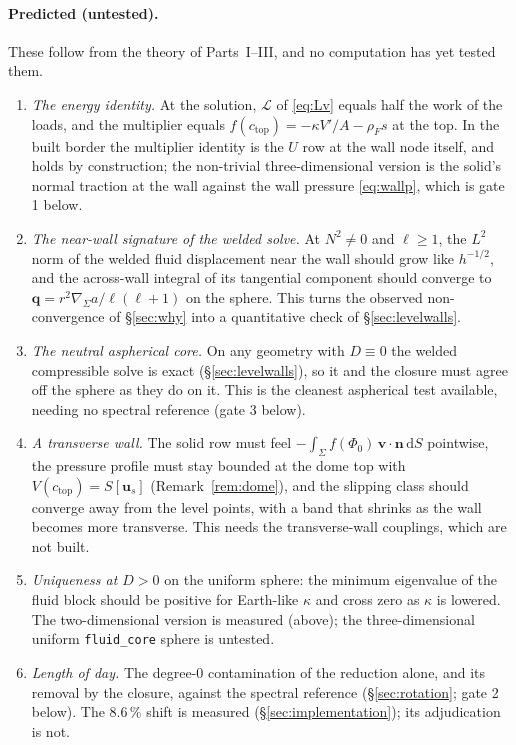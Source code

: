 \documentclass[11pt]{article}
\theoremstyle{definition}
\theoremstyle{remark}
\newcommand{\bu}{\mathbf{u}}
\newcommand{\bv}{\mathbf{v}}
\newcommand{\bn}{\mathbf{n}}
\newcommand{\bq}{\mathbf{q}}
\newcommand{\dS}{\,\mathrm{d}S}
\newcommand{\gradS}{\nabla_\Sigma}
\newcommand{\Ltot}{\mathcal L}
\newcommand{\code}[1]{\texttt{#1}}
\begin{document}
\paragraph{Predicted (untested).} These follow from
the theory of Parts~I--III, and no computation has yet tested them.
\begin{enumerate}[label=(\roman*)]
\item \emph{The energy identity.} At the solution, $\Ltot$ of
  \eqref{eq:Lv} equals half the work of the loads, and the multiplier
  equals $f(c_{\mathrm{top}}) = -\kappa V'/A - \rho_Fs$ at the top. In
  the built border the multiplier identity is the $U$ row at the wall
  node itself, and holds by construction; the non-trivial
  three-dimensional version is the solid's normal traction at the wall
  against the wall pressure \eqref{eq:wallp}, which is gate 1 below.
\item \emph{The near-wall signature of the welded solve.} At $N^2 \ne 0$
  and $\ell \ge 1$, the $L^2$ norm of the welded fluid displacement near
  the wall should grow like $h^{-1/2}$, and the across-wall integral of
  its tangential component should converge to $\bq =
  r^2\gradS a/\ell(\ell + 1)$ on the sphere. This turns the observed
  non-convergence of \S\ref{sec:why} into a quantitative check of
  \S\ref{sec:levelwalls}.
\item \emph{The neutral aspherical core.} On any geometry with $D \equiv
  0$ the welded compressible solve is exact (\S\ref{sec:levelwalls}), so
  it and the closure must agree off the sphere as they do on it. This is
  the cleanest aspherical test available, needing no spectral reference
  (gate 3 below).
\item \emph{A transverse wall.} The solid row must feel
  $-\int_\Sigma f(\Phi_0)\,\bv\cdot\bn\dS$ pointwise, the pressure
  profile must stay bounded at the dome top with $V(c_{\mathrm{top}}) =
  S[\bu_s]$ (Remark~\ref{rem:dome}), and the slipping class should
  converge away from the level points, with a band that shrinks as the
  wall becomes more transverse. This needs the transverse-wall couplings,
  which are not built.
\item \emph{Uniqueness at $D > 0$} on the uniform sphere: the minimum
  eigenvalue of the fluid block should be positive for Earth-like
  $\kappa$ and cross zero as $\kappa$ is lowered. The two-dimensional
  version is measured (above); the three-dimensional uniform
  \code{fluid\_core} sphere is untested.
\item \emph{Length of day.} The degree-0 contamination of the reduction
  alone, and its removal by the closure, against the spectral reference
  (\S\ref{sec:rotation}; gate 2 below). The $8.6\,\%$ shift is measured
  (\S\ref{sec:implementation}); its adjudication is not.
\end{enumerate}
\end{document}
